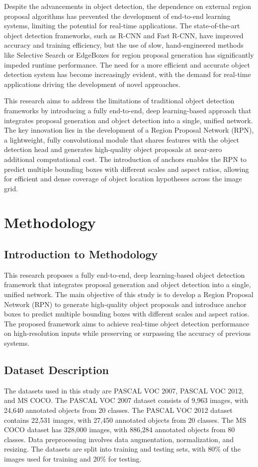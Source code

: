 \documentclass{article}
\begin{document}
Despite the advancements in object detection, the dependence on external region proposal algorithms has prevented the development of end-to-end learning systems, limiting the potential for real-time applications. The state-of-the-art object detection frameworks, such as R-CNN and Fast R-CNN, have improved accuracy and training efficiency, but the use of slow, hand-engineered methods like Selective Search or EdgeBoxes for region proposal generation has significantly impeded runtime performance. The need for a more efficient and accurate object detection system has become increasingly evident, with the demand for real-time applications driving the development of novel approaches.

This research aims to address the limitations of traditional object detection frameworks by introducing a fully end-to-end, deep learning-based approach that integrates proposal generation and object detection into a single, unified network. The key innovation lies in the development of a Region Proposal Network (RPN), a lightweight, fully convolutional module that shares features with the object detection head and generates high-quality object proposals at near-zero additional computational cost. The introduction of anchors enables the RPN to predict multiple bounding boxes with different scales and aspect ratios, allowing for efficient and dense coverage of object location hypotheses across the image grid.

\section{Methodology}
\subsection{Introduction to Methodology}
This research proposes a fully end-to-end, deep learning-based object detection framework that integrates proposal generation and object detection into a single, unified network. The main objective of this study is to develop a Region Proposal Network (RPN) to generate high-quality object proposals and introduce anchor boxes to predict multiple bounding boxes with different scales and aspect ratios. The proposed framework aims to achieve real-time object detection performance on high-resolution inputs while preserving or surpassing the accuracy of previous systems.

\subsection{Dataset Description}
The datasets used in this study are PASCAL VOC 2007, PASCAL VOC 2012, and MS COCO. The PASCAL VOC 2007 dataset consists of 9,963 images, with 24,640 annotated objects from 20 classes. The PASCAL VOC 2012 dataset contains 22,531 images, with 27,450 annotated objects from 20 classes. The MS COCO dataset has 328,000 images, with 886,284 annotated objects from 80 classes. Data preprocessing involves data augmentation, normalization, and resizing. The datasets are split into training and testing sets, with 80\% of the images used for training and 20\% for testing.
\end{document}
